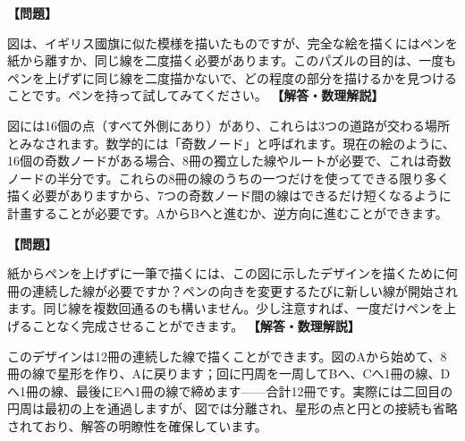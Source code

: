 \documentclass[10pt,a4paper,oneside,openany]{ltjsbook}
\begin{document}
\begin{tcolorbox}[colback=softblue,colframe=primaryblue,title=\textbf{第 240 問：ユニオンジャック （原題: THE UNION JACK.）},arc=2mm,boxrule=1pt,breakable]
\textbf{【問題】}\par\vspace{0.3em}
図は、イギリス國旗に似た模様を描いたものですが、完全な絵を描くにはペンを紙から離すか、同じ線を二度描く必要があります。このパズルの目的は、一度もペンを上げずに同じ線を二度描かないで、どの程度の部分を描けるかを見つけることです。ペンを持って試してみてください。
\tcblower
\textbf{【解答・数理解説】}\par\vspace{0.3em}
図には16個の点（すべて外側にあり）があり、これらは3つの道路が交わる場所とみなされます。数学的には「奇数ノード」と呼ばれます。現在の絵のように、16個の奇数ノードがある場合、8冊の獨立した線やルートが必要で、これは奇数ノードの半分です。これらの8冊の線のうちの一つだけを使ってできる限り多く描く必要がありますから、7つの奇数ノード間の線はできるだけ短くなるように計畫することが必要です。AからBへと進むか、逆方向に進むことができます。
\end{tcolorbox}

\begin{tcolorbox}[colback=softblue,colframe=primaryblue,title=\textbf{第 241 問：切り裂かれた円 （原題: THE DISSECTED CIRCLE.）},arc=2mm,boxrule=1pt,breakable]
\textbf{【問題】}\par\vspace{0.3em}
紙からペンを上げずに一筆で描くには、この図に示したデザインを描くために何冊の連続した線が必要ですか？ペンの向きを変更するたびに新しい線が開始されます。同じ線を複数回通るのも構いません。少し注意すれば、一度だけペンを上げることなく完成させることができます。
\tcblower
\textbf{【解答・数理解説】}\par\vspace{0.3em}
このデザインは12冊の連続した線で描くことができます。図のAから始めて、8冊の線で星形を作り、Aに戻ります；回に円周を一周してBへ、Cへ1冊の線、Dへ1冊の線、最後にEへ1冊の線で締めます——合計12冊です。実際には二回目の円周は最初の上を通過しますが、図では分離され、星形の点と円との接続も省略されており、解答の明瞭性を確保しています。
\end{tcolorbox}
\end{document}
